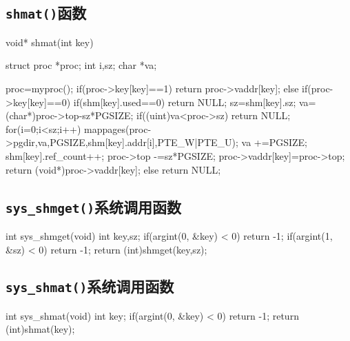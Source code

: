 \documentclass{swfcthesismscctex}
\begin{document}
\subsection{\texttt{shmat()}函数}
\label{sec:shmat}
\begin{ccode}
void* shmat(int key)
{
  struct proc *proc;
  int i,sz;
  char *va;

  proc=myproc();
  if(proc->key[key]==1)
    return proc->vaddr[key];
  else if(proc->key[key]==0)
  {
    if(shm[key].used==0)
      return NULL;
    sz=shm[key].sz;
    va=(char*)proc->top-sz*PGSIZE;
    if((uint)va<proc->sz)
      return NULL;
    for(i=0;i<sz;i++){
      mappages(proc->pgdir,va,PGSIZE,shm[key].addr[i],PTE_W|PTE_U);
      va +=PGSIZE;
    }
    shm[key].ref_count++;
    proc->top -=sz*PGSIZE;
    proc->vaddr[key]=proc->top;
    return (void*)proc->vaddr[key];
  }
  else
    return NULL;
}
\end{ccode}

\subsection{\texttt{sys\_shmget()}系统调用函数}
\label{src:sysshmget}

\begin{ccode}
int sys_shmget(void)
{
  int key,sz;
  if(argint(0, &key) < 0)
    return -1;
  if(argint(1, &sz) < 0)
    return -1;
  return (int)shmget(key,sz);
}
\end{ccode}

\subsection{\texttt{sys\_shmat()}系统调用函数}
\label{src:sysshmat}

\begin{ccode}
int sys_shmat(void)
{
  int key;
  if(argint(0, &key) < 0)
    return -1;
  return (int)shmat(key);
}
\end{ccode}

\end{document}
